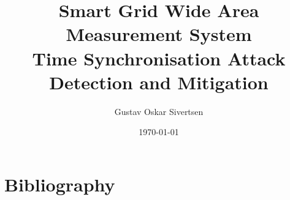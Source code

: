 \documentclass[british,titlepage]{ntnuthesis}
\title{Smart Grid Wide Area Measurement System\\ Time Synchronisation Attack\\  
Detection and Mitigation}
\author{Gustav Oskar Sivertsen}
\date{\today}
\begin{document}




\tableofcontents
\listoffigures





%




%
%


\chapter*{Bibliography}
\printbibliography[heading=none]

%

%
\end{document}

